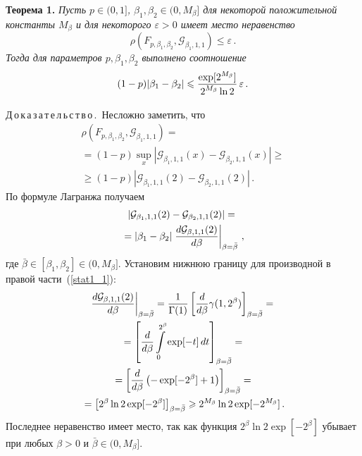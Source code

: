 \begin{multicols}{2}
\medskip

\noindent
\textbf{Теорема 1.} \textit{Пусть $p\in(0,1]$, $\beta_1,\beta_2\in (0, M_{\beta}]$ для
некоторой положительной константы $M_{\beta}$ и для некоторого
$\varepsilon>0$ имеет место неравенство}
\begin{equation}
\rho(F_{p,\beta_1,\beta_2}, {\mathcal G}_{\beta_1,1,1} ) \leqslant
\varepsilon\,. \label{rho1}
\end{equation}
\textit{Тогда для параметров $p,\beta_1,\beta_2$ выполнено соотношение}
\begin{equation}
(1-p) |\beta_1-\beta_2| \leqslant
\displaystyle\frac{\displaystyle \exp[2^{M_{\beta}}]\mathstrut}{\displaystyle 2^{M_{\beta}} \ln2\mathstrut}\,\varepsilon\,.
\label{stat1}
\end{equation}


\smallskip

Д\,о\,к\,а\,з\,а\,т\,е\,л\,ь\,с\,т\,в\,о\,.\
Несложно заметить, что
\begin{multline}
\rho(F_{p,\beta_1,\beta_2}, {\mathcal G}_{\beta_1,1,1} ) ={}\\
{}=
(1-p)\sup\limits_{x}|{\mathcal G}_{\beta_1,1,1}(x) - {\mathcal
G}_{\beta_2,1,1}(x)| \geqslant{}\\
{}\geqslant
 (1-p) |{\mathcal
G}_{\beta_1,1,1}(2) - {\mathcal G}_{\beta_2,1,1}(2)|\,.
\label{stat1_0}
\end{multline}
По формуле Лагранжа получаем
\begin{multline}
|{\mathcal G}_{\beta_1,1,1}(2) - {\mathcal G}_{\beta_2,1,1}(2)| ={}\\
{}=
|\beta_1-\beta_2| \left.\displaystyle\frac{\displaystyle d{\mathcal
G}_{\beta,1,1}(2)\mathstrut}{\displaystyle d\beta\mathstrut}\right|_{\beta = \bar\beta}\,,
\label{stat1_1}
\end{multline}
где $\bar\beta \in [\beta_1,\beta_2] \in (0, M_{\beta}]$.
Установим нижнюю границу для производной в правой
части~(\ref{stat1_1}):
\begin{multline*}
\left.\displaystyle\frac{\displaystyle d{\mathcal G}_{\beta,1,1}(2)\mathstrut}{\displaystyle d\beta\mathstrut}\right|_{\beta =
\bar\beta} = \displaystyle\frac{\displaystyle 1\mathstrut}{\displaystyle \Gamma(1)\mathstrut}
\left[\displaystyle\frac{\displaystyle d\mathstrut}{\displaystyle d\beta\mathstrut}\gamma(1,2^{\beta})\right]_{\beta =\bar\beta} ={}\\
{}= \left[\displaystyle\frac{\displaystyle d\mathstrut}{\displaystyle d\beta\mathstrut} \int\limits_0^{2^{\beta}} \exp[-t]\, dt \right]_{\beta = \bar\beta} = {}\\
{}=
\left[\displaystyle\frac{\displaystyle d\mathstrut}{\displaystyle d\beta\mathstrut} \left(-\exp[-2^{\beta}]+1\right)
\right]_{\beta = \bar\beta} ={}\\
{}=
\left[2^{\beta} \ln 2 \exp[-2^{\beta}] \right]_{\beta = \bar\beta} \geqslant 
2^{M_{\beta}} \ln2 \exp[-2^{M_{\beta}}]\,.
\end{multline*}
Последнее неравенство имеет место, так как функция $2^{\beta} \ln
2 \exp[-2^{\beta}]$ убывает при любых $\beta>0$ и $\bar\beta\in(0,
M_{\beta}]$.


\end{multicols}
